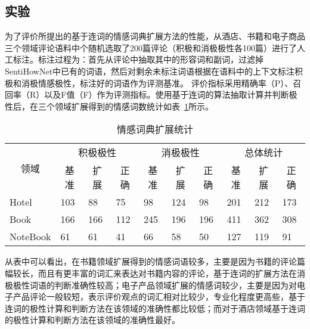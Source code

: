 \subsection{实验}
为了评价所提出的基于连词的情感词典扩展方法的性能，从酒店、书籍和电子商品三个领域评论语料中个随机选取了200篇评论（积极和消极极性各100篇）进行了人工标注。标注过程为：首先从评论中抽取其中的形容词和副词，过滤掉SentiHowNet中已有的词语，然后对剩余未标注词语根据在语料中的上下文标注积极和消极情感极性，标注好的词语作为评测基准。
评价指标采用精确率（P）、召回率（R）以及F值（F）作为评测指标。使用基于连词的算法抽取计算并判断极性后，在三个领域扩展得到的情感词数统计如表~\ref{tab3-2}所示。
\begin{table}[htp]
\centering
\caption{情感词典扩展统计}
\label{tab3-2}
\begin{tabular}{|l|l|l|l|l|l|l|l|l|l|}
\hline
\multicolumn{1}{|c|}{\multirow{2}{*}{领域}} & \multicolumn{3}{c|}{积极极性} & \multicolumn{3}{c|}{消极极性} & \multicolumn{3}{c|}{总体统计} \\ \cline{2-10} 
\multicolumn{1}{|c|}{} & \multicolumn{1}{c|}{基准} & \multicolumn{1}{c|}{扩展} & \multicolumn{1}{c|}{正确} & \multicolumn{1}{c|}{基准} & \multicolumn{1}{c|}{扩展} & \multicolumn{1}{c|}{正确} & \multicolumn{1}{c|}{基准} & \multicolumn{1}{c|}{扩展} & \multicolumn{1}{c|}{正确} \\ \hline
Hotel & 103 & 88 & 75 & 98 & 124 & 98 & 201 & 212 & 173 \\ \hline
Book & 166 & 166 & 112 & 245 & 196 & 196 & 411 & 362 & 308 \\ \hline
NoteBook & 61 & 61 & 41 & 66 & 58 & 50 & 127 & 119 & 91 \\ \hline
\end{tabular}
\end{table}

从表中可以看出，在书籍领域扩展得到的情感词语较多，主要是因为书籍的评论篇幅较长，而且有更丰富的词汇来表达对书籍内容的评论，基于连词的扩展方法在消极极性词语的判断准确性较高；电子产品领域扩展的情感词较少，主要是因为对电子产品评论一般较短，表示评价观点的词汇相对比较少，专业化程度更高些，基于连词的极性计算和判断方法在该领域的准确性都比较低；而对于酒店领域基于连词的极性计算和判断方法在该领域的准确性最好。

